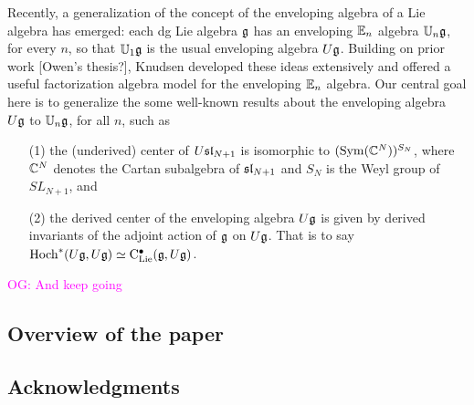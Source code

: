 \documentclass[11pt]{amsart}
\numberwithin{equation}{section}
\def\owen{\textcolor{magenta}{OG: }\textcolor{magenta}}
\begin{document}
Recently, a generalization of the concept of the enveloping algebra of a Lie algebra has emerged: 
each dg Lie algebra $\fg$ has an enveloping $\EE_n$ algebra $\UU_n\fg$, for every $n$, 
so that $\UU_1\fg$ is the usual enveloping algebra $U\fg$. 
Building on prior work \cite{BD, AF} [Owen's thesis?], 
Knudsen \cite{Knudsen} developed these ideas extensively and offered a useful factorization algebra model for the enveloping $\EE_n$ algebra. 
Our central goal here is to generalize the some well-known results about the enveloping algebra $U\fg$ to $\UU_n\fg$, for all $n$, such as
\begin{enumerate}
\item[(1)] the (underived) center of $U\sl_{N+1}$ is isomorphic to $(\Sym(\CC^{N}))^{S_N}$, where $\CC^{N}$ denotes the Cartan subalgebra of $\sl_{N+1}$ and $S_N$ is the Weyl group of $SL_{N+1}$, and
\item[(2)] the derived center of the enveloping algebra $U\fg$ is given by derived invariants of the adjoint action of $\fg$ on $U\fg$. That is to say $\Hoch^*(U\fg,U\fg) \simeq \clies(\fg, U\fg)$.
\end{enumerate}
\owen{And keep going}
%
%
%

\subsection{Overview of the paper}

\subsection{Acknowledgments}
\end{document}
